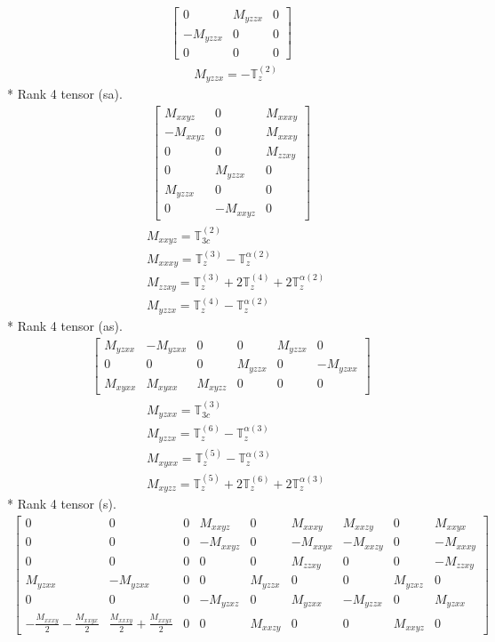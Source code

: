 \documentclass[fleqn,8pt,landscape]{jsarticle}
\begin{document}
\begin{align*}
\begin{bmatrix} 0 & M_{yzzx} & 0 \\ - M_{yzzx} & 0 & 0 \\ 0 & 0 & 0 \end{bmatrix}
\end{align*}
\begin{align*}
& M_{yzzx} = - \mathbb{T}_{z}^{(2)}
\end{align*}
* Rank 4 tensor (sa).
\begin{align*}
\begin{bmatrix} M_{xxyz} & 0 & M_{xxxy} \\ - M_{xxyz} & 0 & M_{xxxy} \\ 0 & 0 & M_{zzxy} \\ 0 & M_{yzzx} & 0 \\ M_{yzzx} & 0 & 0 \\ 0 & - M_{xxyz} & 0 \end{bmatrix}
\end{align*}
\begin{align*}
& M_{xxyz} = \mathbb{T}_{3c}^{(2)} \\
& M_{xxxy} = \mathbb{T}_{z}^{(3)} - \mathbb{T}_{z}^{\alpha(2)} \\
& M_{zzxy} = \mathbb{T}_{z}^{(3)} + 2 \mathbb{T}_{z}^{(4)} + 2 \mathbb{T}_{z}^{\alpha(2)} \\
& M_{yzzx} = \mathbb{T}_{z}^{(4)} - \mathbb{T}_{z}^{\alpha(2)}
\end{align*}
* Rank 4 tensor (as).
\begin{align*}
\begin{bmatrix} M_{yzxx} & - M_{yzxx} & 0 & 0 & M_{yzzx} & 0 \\ 0 & 0 & 0 & M_{yzzx} & 0 & - M_{yzxx} \\ M_{xyxx} & M_{xyxx} & M_{xyzz} & 0 & 0 & 0 \end{bmatrix}
\end{align*}
\begin{align*}
& M_{yzxx} = \mathbb{T}_{3c}^{(3)} \\
& M_{yzzx} = \mathbb{T}_{z}^{(6)} - \mathbb{T}_{z}^{\alpha(3)} \\
& M_{xyxx} = \mathbb{T}_{z}^{(5)} - \mathbb{T}_{z}^{\alpha(3)} \\
& M_{xyzz} = \mathbb{T}_{z}^{(5)} + 2 \mathbb{T}_{z}^{(6)} + 2 \mathbb{T}_{z}^{\alpha(3)}
\end{align*}
* Rank 4 tensor (s).
\begin{align*}
\begin{bmatrix} 0 & 0 & 0 & M_{xxyz} & 0 & M_{xxxy} & M_{xxzy} & 0 & M_{xxyx} \\ 0 & 0 & 0 & - M_{xxyz} & 0 & - M_{xxyx} & - M_{xxzy} & 0 & - M_{xxxy} \\ 0 & 0 & 0 & 0 & 0 & M_{zzxy} & 0 & 0 & - M_{zzxy} \\ M_{yzxx} & - M_{yzxx} & 0 & 0 & M_{yzzx} & 0 & 0 & M_{yzxz} & 0 \\ 0 & 0 & 0 & - M_{yzxz} & 0 & M_{yzxx} & - M_{yzzx} & 0 & M_{yzxx} \\ - \frac{M_{xxxy}}{2} - \frac{M_{xxyx}}{2} & \frac{M_{xxxy}}{2} + \frac{M_{xxyx}}{2} & 0 & 0 & M_{xxzy} & 0 & 0 & M_{xxyz} & 0 \end{bmatrix}
\end{align*}
\end{document}
